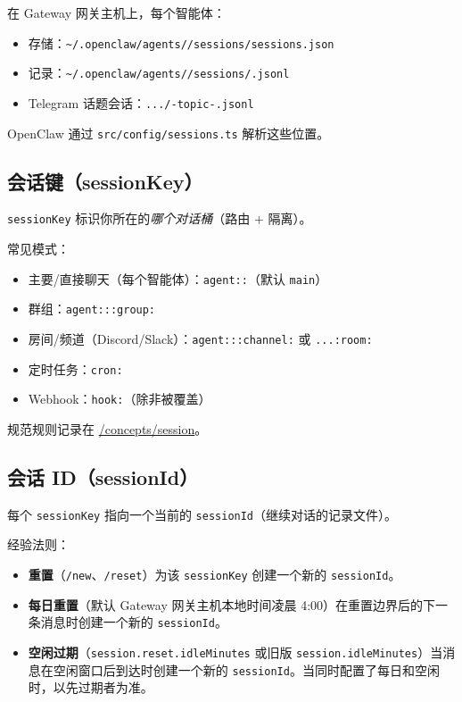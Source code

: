 在 Gateway 网关主机上，每个智能体：

\begin{itemize}
  \item 存储：\texttt{\textasciitilde{}/.openclaw/agents//sessions/sessions.json}
  \item 记录：\texttt{\textasciitilde{}/.openclaw/agents//sessions/.jsonl}
  \item Telegram 话题会话：\texttt{.../-topic-.jsonl}
\end{itemize}


OpenClaw 通过 \texttt{src/config/sessions.ts} 解析这些位置。

\hrulefill


\subsection{会话键（sessionKey）}


\texttt{sessionKey} 标识你所在的\textit{哪个对话桶}（路由 + 隔离）。

常见模式：

\begin{itemize}
  \item 主要/直接聊天（每个智能体）：\texttt{agent::}（默认 \texttt{main}）
  \item 群组：\texttt{agent:::group:}
  \item 房间/频道（Discord/Slack）：\texttt{agent:::channel:} 或 \texttt{...:room:}
  \item 定时任务：\texttt{cron:}
  \item Webhook：\texttt{hook:}（除非被覆盖）
\end{itemize}


规范规则记录在 \href{/concepts/session}{/concepts/session}。

\hrulefill


\subsection{会话 ID（sessionId）}


每个 \texttt{sessionKey} 指向一个当前的 \texttt{sessionId}（继续对话的记录文件）。

经验法则：

\begin{itemize}
  \item \textbf{重置}（\texttt{/new}、\texttt{/reset}）为该 \texttt{sessionKey} 创建一个新的 \texttt{sessionId}。
  \item \textbf{每日重置}（默认 Gateway 网关主机本地时间凌晨 4:00）在重置边界后的下一条消息时创建一个新的 \texttt{sessionId}。
  \item \textbf{空闲过期}（\texttt{session.reset.idleMinutes} 或旧版 \texttt{session.idleMinutes}）当消息在空闲窗口后到达时创建一个新的 \texttt{sessionId}。当同时配置了每日和空闲时，以先过期者为准。
\end{itemize}


